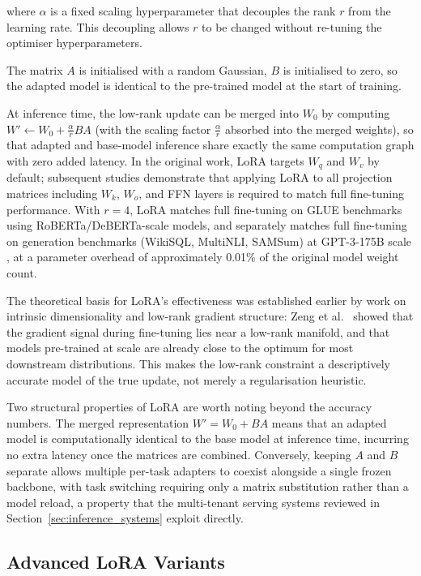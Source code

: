 where $\alpha$ is a fixed scaling hyperparameter that decouples the rank $r$ from the learning rate. This decoupling allows $r$ to be changed without re-tuning the optimiser hyperparameters.

The matrix $A$ is initialised with a random Gaussian, $B$ is initialised to zero, so
the adapted model is identical to the pre-trained model at the start of training. 

At inference time, the low-rank update can be merged into $W_0$ by computing
$W' \leftarrow W_0 + \frac{\alpha}{r}BA$ (with the scaling factor $\frac{\alpha}{r}$ absorbed into the merged weights), so that adapted and base-model inference share
exactly the same computation graph with zero added latency. In the original work, LoRA targets
$W_q$ and $W_v$ by default; subsequent studies demonstrate that applying LoRA to all
projection matrices including $W_k$, $W_o$, and FFN layers is required to match full
fine-tuning performance. With $r = 4$, LoRA matches full fine-tuning on GLUE benchmarks using
RoBERTa/DeBERTa-scale models, and separately matches full fine-tuning on
generation benchmarks (WikiSQL, MultiNLI, SAMSum) at GPT-3-175B scale
\cite{Hu2022}, at a parameter overhead of
approximately 0.01\% of the original model weight count.

The theoretical basis for LoRA's effectiveness was established earlier by work on
intrinsic dimensionality and low-rank gradient structure: Zeng et al.~\cite{ZengExpressive2024}
showed that the gradient signal during fine-tuning lies near a low-rank manifold, and
that models pre-trained at scale are already close to the optimum for most downstream
distributions. This makes the low-rank constraint a descriptively accurate model of the
true update, not merely a regularisation heuristic.

Two structural properties of LoRA are worth noting beyond the accuracy numbers. The merged
representation $W' = W_0 + BA$ means that an adapted model is computationally identical to
the base model at inference time, incurring no extra latency once the matrices are combined.
Conversely, keeping $A$ and $B$ separate allows multiple per-task adapters to coexist
alongside a single frozen backbone, with task switching requiring only a matrix substitution
rather than a model reload, a property that the multi-tenant serving systems reviewed in
Section~\ref{sec:inference_systems} exploit directly.

\subsection{Advanced LoRA Variants}
\label{sec:peft:lora_variants}

